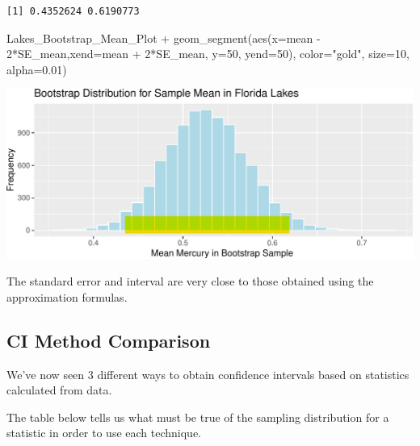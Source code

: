 \documentclass[
  letterpaper,
  DIV=11,
  numbers=noendperiod]{scrreprt}
\newenvironment{Shaded}{\begin{snugshade}}{\end{snugshade}}
\newcommand{\AttributeTok}[1]{\textcolor[rgb]{0.40,0.45,0.13}{#1}}
\newcommand{\DecValTok}[1]{\textcolor[rgb]{0.68,0.00,0.00}{#1}}
\newcommand{\FloatTok}[1]{\textcolor[rgb]{0.68,0.00,0.00}{#1}}
\newcommand{\FunctionTok}[1]{\textcolor[rgb]{0.28,0.35,0.67}{#1}}
\newcommand{\NormalTok}[1]{\textcolor[rgb]{0.00,0.23,0.31}{#1}}
\newcommand{\SpecialCharTok}[1]{\textcolor[rgb]{0.37,0.37,0.37}{#1}}
\newcommand{\StringTok}[1]{\textcolor[rgb]{0.13,0.47,0.30}{#1}}
\begin{document}
\begin{verbatim}
[1] 0.4352624 0.6190773
\end{verbatim}

\begin{Shaded}
\begin{Highlighting}[]
\NormalTok{Lakes\_Bootstrap\_Mean\_Plot }\SpecialCharTok{+} 
  \FunctionTok{geom\_segment}\NormalTok{(}\FunctionTok{aes}\NormalTok{(}\AttributeTok{x=}\NormalTok{mean }\SpecialCharTok{{-}} \DecValTok{2}\SpecialCharTok{*}\NormalTok{SE\_mean,}\AttributeTok{xend=}\NormalTok{mean }\SpecialCharTok{+} \DecValTok{2}\SpecialCharTok{*}\NormalTok{SE\_mean, }\AttributeTok{y=}\DecValTok{50}\NormalTok{, }\AttributeTok{yend=}\DecValTok{50}\NormalTok{), }
               \AttributeTok{color=}\StringTok{"gold"}\NormalTok{, }\AttributeTok{size=}\DecValTok{10}\NormalTok{, }\AttributeTok{alpha=}\FloatTok{0.01}\NormalTok{) }
\end{Highlighting}
\end{Shaded}

\includegraphics{Ch4_files/figure-pdf/unnamed-chunk-33-1.pdf}

The standard error and interval are very close to those obtained using
the approximation formulas.

\subsection{CI Method Comparison}\label{ci-method-comparison}

We've now seen 3 different ways to obtain confidence intervals based on
statistics calculated from data.

The table below tells us what must be true of the sampling distribution
for a statistic in order to use each technique.
\end{document}
